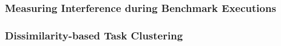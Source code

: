 \subsubsection{Measuring Interference during Benchmark Executions}
\label{sec:resource_contention_analysis}

\subsubsection{Dissimilarity-based Task Clustering}
\label{sec:evaluation_task_consolidation}


